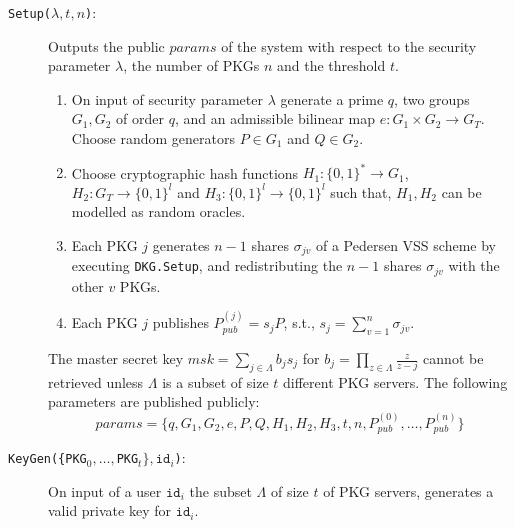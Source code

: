 \documentclass{llncs}
\newcommand{\id}[1]{\ensuremath{\mathtt{id}_{#1}}}
\begin{document}
\begin{description}
    \item[\texttt{Setup($\lambda, t, n$)}:] Outputs the public $params$ of the system with respect to the security parameter $\lambda$, the number of PKGs $n$ and the threshold $t$.
    \begin{enumerate}
        \item On input of security parameter $\lambda$ generate a prime $q$, two groups $G_1, G_2$ of order $q$, and an admissible bilinear map $e: G_1 \times G_2 \rightarrow G_T$. Choose random generators $P \in G_1$ and $Q \in G_2$. 
    
        \item Choose cryptographic hash functions $H_1: \{ 0,1 \}^{*} \rightarrow G_1$, ${H_2: G_T \rightarrow \{ 0,1 \}^{l}}$ and $H_3: \{ 0, 1 \}^{l} \rightarrow \{ 0,1 \}^{l}$ such that, $H_1, H_2$ can be modelled as random oracles.
        
        \item Each PKG $j$ generates $n-1$ shares $\sigma_{jv}$ of a Pedersen VSS scheme by executing \texttt{DKG.Setup}, and redistributing the $n-1$ shares $\sigma_{jv}$ with the other $v$ PKGs.

        \item Each PKG $j$ publishes $P_{pub}^{(j)} = s_j P$, s.t., $s_j=\sum_{v=1}^n \sigma_{jv}$.
    \end{enumerate}
    
    The master secret key $msk = \sum_{j \in \Lambda} b_j s_j$ for $b_j = \prod_{z \in \Lambda} \frac{z}{z-j}$ cannot be retrieved unless $\Lambda$ is a subset of size $t$ different PKG servers. The following parameters are published publicly:
    \begin{equation*}
    params = \{ q, G_1, G_2, e, P, Q, H_1, H_2, H_3, t, n, P_{pub}^{(0)}, \ldots, P_{pub}^{(n)} \}
    \end{equation*}
    
    \bigskip

    \item[\texttt{KeyGen(\{PKG$_0,\ldots,$PKG$_t\}, \id{i}$)}:] On input of a user $\id{i}$ the subset $\Lambda$ of size $t$ of PKG servers, generates a valid private key for \id{i}. 
    

\end{description}
\end{document}
